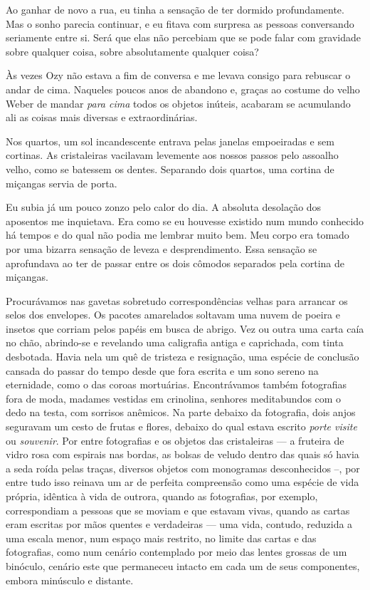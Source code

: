 Ao ganhar de novo a rua, eu tinha a sensação de ter dormido profundamente. Mas o sonho parecia continuar, e eu fitava com surpresa as pessoas conversando seriamente entre si. Será que elas não percebiam que se pode falar com gravidade sobre qualquer coisa, sobre absolutamente qualquer coisa?

Às vezes Ozy não estava a fim de conversa e me levava consigo para rebuscar o andar de cima. Naqueles poucos anos de abandono e, graças ao costume do velho Weber de mandar \textit{para cima} todos os objetos inúteis, acabaram se acumulando ali as coisas mais diversas e extraordinárias.

Nos quartos, um sol incandescente entrava pelas janelas empoeiradas e sem cortinas. As cristaleiras vacilavam levemente aos nossos passos pelo assoalho velho, como se batessem os dentes. Separando dois quartos, uma cortina de miçangas servia de porta.

Eu subia já um pouco zonzo pelo calor do dia. A absoluta desolação dos aposentos me inquietava. Era como se eu houvesse existido num mundo conhecido há tempos e do qual não podia me lembrar muito bem. Meu corpo era tomado por uma bizarra sensação de leveza e desprendimento. Essa sensação se aprofundava ao ter de passar entre os dois cômodos separados pela cortina de miçangas.

Procurávamos nas gavetas sobretudo correspondências velhas para arrancar os selos dos envelopes. Os pacotes amarelados soltavam uma nuvem de poeira e insetos que corriam pelos papéis em busca de abrigo. Vez ou outra uma carta caía no chão, abrindo-se e revelando uma caligrafia antiga e caprichada, com tinta desbotada. Havia nela um quê de tristeza e resignação, uma espécie de conclusão cansada do passar do tempo desde que fora escrita e um sono sereno na eternidade, como o das coroas mortuárias. Encontrávamos também fotografias fora de moda, madames vestidas em crinolina, senhores meditabundos com o dedo na testa, com sorrisos anêmicos. Na parte debaixo da fotografia, dois anjos seguravam um cesto de frutas e flores, debaixo do qual estava escrito \emph{porte visite} ou \emph{souvenir}. Por entre fotografias e os objetos das cristaleiras --- a fruteira de vidro rosa com espirais nas bordas, as bolsas de veludo dentro das quais só havia a seda roída pelas traças, diversos objetos com monogramas desconhecidos --, por entre tudo isso reinava um ar de perfeita compreensão como uma espécie de vida própria, idêntica à vida de outrora, quando as fotografias, por exemplo, correspondiam a pessoas que se moviam e que estavam vivas, quando as cartas eram escritas por mãos quentes e verdadeiras --- uma vida, contudo, reduzida a uma escala menor, num espaço mais restrito, no limite das cartas e das fotografias, como num cenário contemplado por meio das lentes grossas de um binóculo, cenário este que permaneceu intacto em cada um de seus componentes, embora minúsculo e distante.


